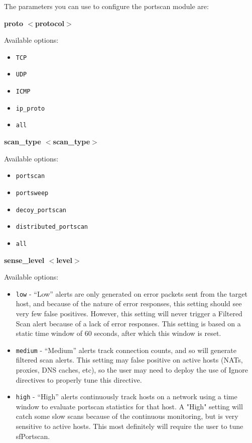\documentclass[english]{report}
\newcounter{slistnum}
\newenvironment{slist}
{ \begin{list}{ {\bf \arabic{slistnum}.} }{\usecounter{slistnum} } }
{ \end{list} }
\begin{document}
The parameters you can use to configure the portscan module are:

\begin{slist}
\item \textbf{proto $<$protocol$>$}

Available options:

\begin{itemize}
\item \texttt{TCP}
\item \texttt{UDP}
\item \texttt{ICMP}
\item \texttt{ip\_proto}
\item \texttt{all}
\end{itemize}

\item \textbf{scan\_type $<$scan\_type$>$}

Available options: 

\begin{itemize}
\item \texttt{portscan} 
\item \texttt{portsweep} 
\item \texttt{decoy\_portscan}
\item \texttt{distributed\_portscan}
\item \texttt{all}
\end{itemize}

\item \textbf{sense\_level $<$level$>$}

Available options:

\begin{itemize}

\item \texttt{low} - ``Low'' alerts are only generated on error packets sent
from the target host, and because of the nature of error responses, this
setting should see very few false positives. However, this setting will never
trigger a Filtered Scan alert because of a lack of error responses. This
setting is based on a static time window of 60 seconds, after which this window
is reset.

\item \texttt{medium} - ``Medium'' alerts track connection counts, and so will
generate filtered scan alerts. This setting may false positive on active hosts
(NATs, proxies, DNS caches, etc), so the user may need to deploy the use of
Ignore directives to properly tune this directive.

\item \texttt{high} - ``High'' alerts continuously track hosts on a network
using a time window to evaluate portscan statistics for that host. A "High"
setting will catch some slow scans because of the continuous monitoring, but is
very sensitive to active hosts. This most definitely will require the user to
tune sfPortscan.


\end{itemize}
\end{slist}
\end{document}
